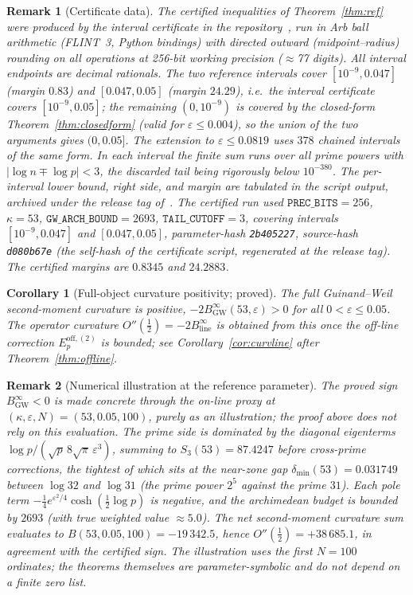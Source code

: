 \documentclass[11pt]{article}
\newtheorem{corollary}[theorem]{Corollary}
\newtheorem*{remark}{Remark}
\newcommand{\BinfGW}{B_{\mathrm{GW}}^{\infty}}   %
\newcommand{\Binfline}{B_{\mathrm{line}}^{\infty}} %
\newcommand{\dmin}{\delta_{\min}}           %
\newcommand{\Eoff}{E_p^{\mathrm{off},(2)}}  %
\begin{document}
\begin{remark}[Certificate data]
The certified inequalities of Theorem~\ref{thm:ref} were produced by the
interval certificate in the repository~\cite{Code}, run in Arb ball
arithmetic (FLINT~3, Python bindings) with directed outward (midpoint--radius)
rounding on all operations at 256-bit working precision ($\approx$77 digits). All interval endpoints are
decimal rationals. The two reference intervals cover $[10^{-9},0.047]$ (margin
$0.83$) and $[0.047,0.05]$ (margin $24.29$), i.e.\ the interval certificate
covers $[10^{-9},0.05]$; the remaining $(0,10^{-9})$ is covered by the
closed-form Theorem~\ref{thm:closedform} (valid for $\varepsilon\le0.004$), so
the \emph{union} of the two arguments gives $(0,0.05]$. The extension to
$\varepsilon\le 0.0819$
uses $378$ chained intervals of the same form. In each interval the finite
sum runs over all prime powers with $|\log n\mp\log p|<3$, the discarded
tail being rigorously below $10^{-380}$. The per-interval lower bound, right
side, and margin are tabulated in the script output, archived under the
release tag of~\cite{Code}.
The certified run used $\texttt{PREC\_BITS}=256$, $\kappa=53$,
$\texttt{GW\_ARCH\_BOUND}=2693$, $\texttt{TAIL\_CUTOFF}=3$, covering intervals
$[10^{-9},0.047]$ and $[0.047,0.05]$, parameter-hash \texttt{2b405227},
source-hash \texttt{d080b67e} (the self-hash of the certificate script,
regenerated at the release tag). The certified margins are $0.8345$ and
$24.2883$.
\end{remark}

\begin{corollary}[Full-object curvature positivity; proved]
\label{cor:curv}
The full Guinand--Weil second-moment curvature is positive,
$-2\BinfGW(53,\varepsilon)>0$ for all $0<\varepsilon\le 0.05$.
The operator curvature $O''(\tfrac12)=-2\Binfline$ is obtained from this once
the off-line correction $\Eoff$ is bounded; see
Corollary~\ref{cor:curvline} after Theorem~\ref{thm:offline}.
\end{corollary}

\begin{remark}[Numerical illustration at the reference parameter]
The proved sign $\BinfGW<0$ is made concrete through the on-line proxy at
$(\kappa,\varepsilon,N)=(53,0.05,100)$, purely as an illustration; the
proof above does not rely on this evaluation. The prime side is dominated
by the diagonal eigenterms $\log p/(\sqrt p\,8\sqrt\pi\,\varepsilon^3)$,
summing to $S_3(53)=87.4247$ before cross-prime corrections, the tightest
of which sits at the near-zone gap $\dmin(53)=0.031749$ between $\log 32$
and $\log 31$ (the prime power $2^5$ against the prime $31$). Each pole term
$-\tfrac14 e^{\varepsilon^2/4}\cosh(\tfrac12\log p)$ is negative, and the
archimedean budget is bounded by $2693$ (with true weighted value
$\approx 5.0$). The net second-moment curvature sum evaluates to
$B(53,0.05,100)=-19\,342.5$, hence $O''(\tfrac12)=+38\,685.1$, in
agreement with the certified sign. The illustration uses the first $N=100$
ordinates; the theorems themselves are parameter-symbolic and do not depend
on a finite zero list.
\end{remark}
\end{document}
